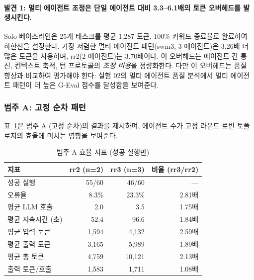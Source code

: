 \documentclass[a4paper,11pt]{article}
\begin{document}
\paragraph{발견 1: 멀티 에이전트 조정은 단일 에이전트 대비 3.3--6.1배의 토큰 오버헤드를 발생시킨다.}
Solo 베이스라인은 25개 태스크를 평균 1,287 토큰, 100\% 키워드 종료율로 완료하여 하한선을 설정한다. 가장 저렴한 멀티 에이전트 패턴(swm3, 3 에이전트)은 3.26배 더 많은 토큰을 사용하며, rr2(2 에이전트)는 3.70배이다. 이 오버헤드는 에이전트 간 통신, 컨텍스트 축적, 턴 프로토콜의 \emph{조정 비용}을 정량화한다. 다만 이 오버헤드는 품질 향상과 비교하여 평가해야 한다: 실험 02의 멀티 에이전트 품질 분석에서 멀티 에이전트 패턴이 더 높은 G-Eval 점수를 달성함을 보여준다.

\subsubsection{범주 A: 고정 순차 패턴}

표~\ref{tab:cat-a-efficiency}은 범주 A (고정 순차)의 결과를 제시하며, 에이전트 수가 고정 라운드 로빈 토폴로지의 효율에 미치는 영향을 보여준다.

\begin{table}[H]
\centering
\caption{범주 A 효율 지표 (성공 실행만)}
\label{tab:cat-a-efficiency}
{\small
\begin{tabular}{lrrr}
\toprule
지표 & rr2 (n=2) & rr3 (n=3) & 비율 (rr3/rr2) \\
\midrule
성공 실행      & 55/60 & 46/60 & --- \\
오류율          & 8.3\% & 23.3\% & 2.81배 \\
평균 LLM 호출  & 2.0 & 3.5 & 1.75배 \\
평균 지속시간 (초) & 52.4 & 96.6 & 1.84배 \\
평균 입력 토큰  & 1,594 & 4,132 & 2.59배 \\
평균 출력 토큰  & 3,165 & 5,989 & 1.89배 \\
평균 총 토큰    & 4,759 & 10,121 & 2.13배 \\
출력 토큰/호출  & 1,583 & 1,711 & 1.08배 \\
\bottomrule
\end{tabular}
}
\end{table}
\end{document}
